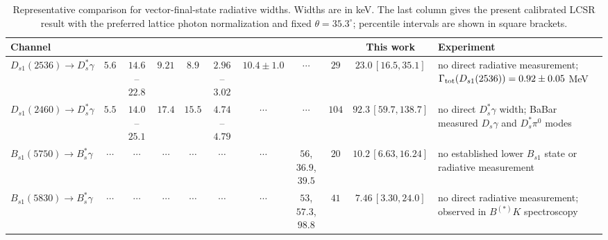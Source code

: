 \begin{widetext}
\begin{table}[t]
\caption{Representative comparison for vector-final-state radiative widths. Widths are in keV. The last column gives the present calibrated LCSR result with the preferred lattice photon normalization and fixed $\theta=35.3^\circ$; percentile intervals are shown in square brackets.}
\label{tab:vector-final-literature}
\begin{ruledtabular}
\begin{tabular}{lcccccccccp{}}
Channel & \cite{Godfrey:2005ww} & \cite{Goity:2000dk} & \cite{Green:2016occ} & \cite{Radford:2009bs} & \cite{Chen:2020ejk} & \cite{Korner:1992pz} & \cite{Li:2021qgz,Godfrey:2016nwn,Lu:2016bbk} & \cite{Bondar:2025smw} & This work & Experiment\\
\hline
$D_{s1}(2536)\to D_s^\ast\gamma$ & $5.6$ & $14.6$--$22.8$ & $9.21$ & $8.9$ & $2.96$--$3.02$ & $10.4\pm1.0$ & $\cdots$ & $29$ & $23.0\,[16.5,35.1]$ & no direct radiative measurement; $\Gamma_{\rm tot}(D_{s1}(2536))=0.92\pm0.05$ MeV\\
$D_{s1}(2460)\to D_s^\ast\gamma$ & $5.5$ & $14.0$--$25.1$ & $17.4$ & $15.5$ & $4.74$--$4.79$ & $\cdots$ & $\cdots$ & $104$ & $92.3\,[59.7,138.7]$ & no direct $D_s^\ast\gamma$ width; BaBar measured $D_s\gamma$ and $D_s^\ast\pi^0$ modes\\
$B_{s1}(5750)\to B_s^\ast\gamma$ & $\cdots$ & $\cdots$ & $\cdots$ & $\cdots$ & $\cdots$ & $\cdots$ & $56$, $36.9$, $39.5$ & $20$ & $10.2\,[6.63,16.24]$ & no established lower $B_{s1}$ state or radiative measurement\\
$B_{s1}(5830)\to B_s^\ast\gamma$ & $\cdots$ & $\cdots$ & $\cdots$ & $\cdots$ & $\cdots$ & $\cdots$ & $53$, $57.3$, $98.8$ & $41$ & $7.46\,[3.30,24.0]$ & no direct radiative measurement; observed in $B^{(*)}K$ spectroscopy\\
\end{tabular}
\end{ruledtabular}
\end{table}
\end{widetext}

